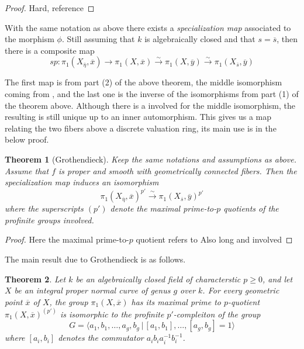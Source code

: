 \documentclass{article}
\newtheorem{theorem}{Theorem}[section]
\theoremstyle{definition}
\theoremstyle{remark}
\theoremstyle{plain}
\begin{document}
 \begin{proof}
	 Hard,  reference
 \end{proof}

 With the same notation as above there exists a \textit{specialization map} associated to the morphism $\phi$.
 Still assuming that $k$ is algebraically closed and that $s = \overline{s}$, then there is a composite map
 \[\textit{sp}: \pi_1(X_{\overline{\eta}}, \overline{x}) \to \pi_1(X, \overline{x}) \xrightarrow{\sim} \pi_1(X, \overline{y}) \xrightarrow{\sim} \pi_1(X_{\overline{s}}, \overline{y})\]

 The first map is from part (2) of the above theorem, the middle isomorphism coming from , and the last one is the inverse of the isomorphisms from part (1) of the theorem above.
Although there is a involved for the middle isomorphism, the resulting is still unique up to an inner automorphism.
This gives us a map relating the two fibers above a discrete valuation ring, its main use is in the below proof.

\begin{theorem}[Grothendieck] 
	Keep the same notations and assumptions as above.
	Assume that $f$ is proper and smooth with geometrically connected fibers.
	Then the specialization map induces an isomorphism 
	\[\pi_1(X_{\overline{\eta}}, \overline{x})^{p'} \xrightarrow{\sim} \pi_1(X_{\overline{s}}, \overline{y})^{p'}\]
	where the superscripts $(p')$ denote the maximal prime-to-$p$ quotients of the profinite groups involved.
	
\end{theorem}

 \begin{proof}
	 Here the maximal prime-to-$p$ quotient refers to 
	 Also long and involved 
 \end{proof}
 
 The main result due to Grothendieck is as follows.
\begin{theorem}
	Let $k$ be an algebraically closed field of characterstic $p \geq 0$, and let $X$ be an integral proper normal curve of genus $g$ over $k$.
	For every geometric point $\overline{x}$ of $X$, the group $\pi_1(X, \overline{x})$ has its maximal prime to $p$-quotient $\pi_1(X, \overline{x})^{(p')}$ is isomorphic to the profinite $p'$-compleiton of the group
	\[G = \langle a_1, b_1, \dots, a_g, b_g \,|\, [a_1,b_1], \dots, [a_g, b_g] = 1\rangle\]
	where $[a_i, b_i]$ denotes the commutator $a_i b_i a_i^{-1} b_i^{-1}$.
\end{theorem}
\end{document}
